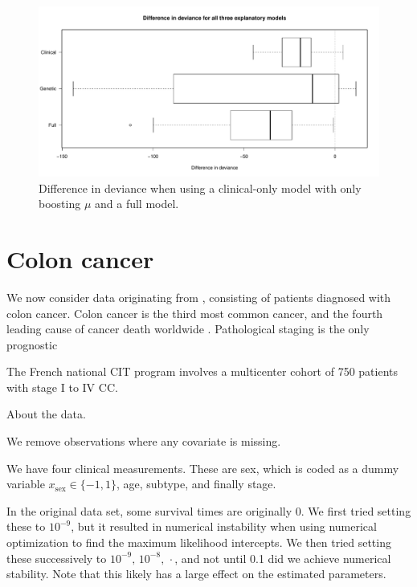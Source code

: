 \begin{figure}\label{fig:neuroblastoma-deviances}
\caption{Difference in deviance when using a clinical-only model with only boosting $\mu$ and a full model.}
\centering\includegraphics[scale=0.4]{figures/deviance_all_boxplot_w_title.pdf}
\end{figure}



\section{Colon cancer}
We now consider data originating from \citet{marisa-data}, consisting of patients diagnosed with colon cancer.
Colon cancer is the third most common cancer, and the fourth leading cause of cancer death worldwide \citep{marisa-data}.
Pathological staging is the only prognostic

The French national CIT program involves a multicenter cohort of 750 patients with stage I to IV CC.

About the data.

We remove observations where any covariate is missing.

We have four clinical measurements.
These are sex, which is coded as a dummy variable $x_{\text{sex}}\in\{-1,1\}$, age, subtype, and finally stage.

In the original data set, some survival times are originally 0.
We first tried setting these to $10^{-9}$, but it resulted in numerical instability when using numerical optimization to find the maximum likelihood intercepts.
We then tried setting these successively to $10^{-9},\,10^{-8},\,\cdot$, and not until 0.1 did we achieve numerical stability.
Note that this likely has a large effect on the estimated parameters.